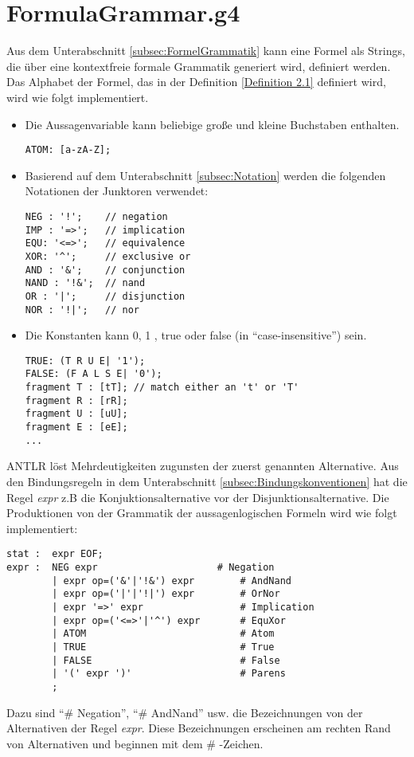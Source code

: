 \section{FormulaGrammar.g4}
Aus dem Unterabschnitt \ref{subsec:FormelGrammatik} kann eine Formel als Strings, die über eine kontextfreie formale Grammatik generiert wird, definiert werden. Das Alphabet der Formel, das in der Definition \ref{Definition 2.1} definiert wird, wird wie folgt implementiert.
\begin{itemize}
\item Die Aussagenvariable kann beliebige große und kleine Buchstaben enthalten.

\begin{lstlisting}[language=Grammar, basicstyle=\scriptsize]
ATOM: [a-zA-Z];
\end{lstlisting}
\item Basierend auf dem Unterabschnitt \ref{subsec:Notation} werden die folgenden Notationen der Junktoren verwendet:

\begin{lstlisting}[language=Grammar, basicstyle=\scriptsize]
NEG : '!';    // negation
IMP : '=>';   // implication		
EQU: '<=>';   // equivalence
XOR: '^';     // exclusive or
AND : '&';    // conjunction
NAND : '!&';  // nand
OR : '|';     // disjunction
NOR : '!|';   // nor
\end{lstlisting}

\item Die Konstanten kann 0, 1 , true oder false (in ``case-insensitive'') sein.

\begin{lstlisting}[language=Grammar, basicstyle=\scriptsize]
TRUE: (T R U E| '1'); 
FALSE: (F A L S E| '0');
fragment T : [tT]; // match either an 't' or 'T'
fragment R : [rR];
fragment U : [uU];
fragment E : [eE];
...
\end{lstlisting}
\end{itemize}

ANTLR löst Mehrdeutigkeiten zugunsten der zuerst genannten Alternative. Aus den Bindungsregeln in dem Unterabschnitt \ref{subsec:Bindungskonventionen} hat 
die Regel \textit{expr} z.B die Konjuktionsalternative vor der Disjunktionsalternative. Die Produktionen von der Grammatik der aussagenlogischen Formeln wird wie folgt implementiert: 

\begin{lstlisting}[language=Grammar, basicstyle=\scriptsize]
stat :	expr EOF;
expr :	NEG expr                     # Negation
		| expr op=('&'|'!&') expr        # AndNand
		| expr op=('|'|'!|') expr        # OrNor		
		| expr '=>' expr                 # Implication	
		| expr op=('<=>'|'^') expr       # EquXor							
		| ATOM                           # Atom
		| TRUE                           # True
		| FALSE                          # False
		| '(' expr ')'                   # Parens
		;
\end{lstlisting}


Dazu sind ``\# Negation'', ``\# AndNand'' usw. die Bezeichnungen von der Alternativen der Regel \textit{expr}. Diese Bezeichnungen erscheinen am rechten Rand von Alternativen und beginnen mit dem \# -Zeichen.